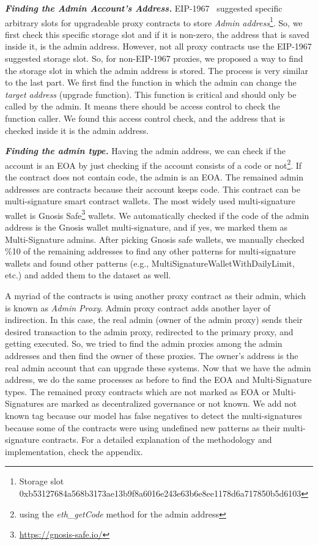 \textbf{\emph{Finding the Admin Account's Address.}} EIP-1967~\cite{eip1967} suggested specific arbitrary slots for upgradeable proxy contracts to store \textit{Admin address}\footnote{Storage slot 0xb53127684a568b3173ae13b9f8a6016e243e63b6e8ee1178d6a717850b5d6103}. So, we first check this specific storage slot and if it is non-zero, the address that is saved inside it, is the admin address. 
However, not all proxy contracts use the EIP-1967 suggested storage slot. So, for non-EIP-1967 proxies, we proposed a way to find the storage slot in which the admin address is stored. The process is very similar to the last part. We first find the function in which the admin can change the \textit{target address} (upgrade function). This function is critical and should only be called by the admin. It means there should be access control to check the function caller. We found this access control check, and the address that is checked inside it is the admin address.

\textbf{\emph{Finding the admin type.}} Having the admin address, we can check if the account is an EOA by just checking if the account consists of a code or not\footnote{using the \textit{eth\_getCode} method for the admin address}. If the contract does not contain code, the admin is an EOA. The remained admin addresses are contracts because their account keeps code. This contract can be multi-signature smart contract wallets. The most widely used multi-signature wallet is Gnosis Safe\footnote{\url{https://gnosis-safe.io/}} wallets. We automatically checked if the code of the admin address is the Gnosis wallet multi-signature, and if yes, we marked them as Multi-Signature admins. After picking Gnosis safe wallets, we manually checked \%10 of the remaining addresses to find any other patterns for multi-signature wallets and found other patterns (e.g., MultiSignatureWalletWithDailyLimit, etc.) and added them to the dataset as well. 

A myriad of the contracts is using another proxy contract as their admin, which is known as \textit{Admin Proxy}. Admin proxy contract adds another layer of indirection. In this case, the real admin (owner of the admin proxy) sends their desired transaction to the admin proxy, redirected to the primary proxy, and getting executed. So, we tried to find the admin proxies among the admin addresses and then find the owner of these proxies. The owner's address is the real admin account that can upgrade these systems. Now that we have the admin address, we do the same processes as before to find the EOA and Multi-Signature types.
The remained proxy contracts which are not marked as EOA or Multi-Signatures are marked as decentralized governance or not known. We add not known tag because our model has false negatives to detect the multi-signatures because some of the contracts were using undefined new patterns as their multi-signature contracts. 
For a detailed explanation of the methodology and implementation, check the appendix.


